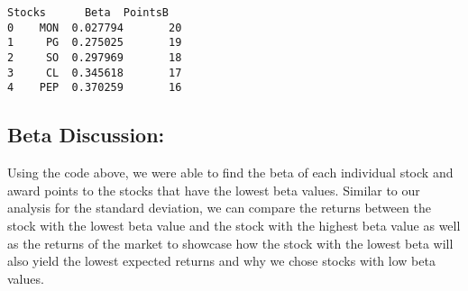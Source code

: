 \documentclass[11pt]{article}
\makeatletter
\newcommand{\boxspacing}{\kern\kvtcb@left@rule\kern\kvtcb@boxsep}
\newcommand{\prompt}[4]{
        {\ttfamily\llap{{\color{#2}[#3]:\hspace{3pt}#4}}\vspace{-\baselineskip}}
    }
\makeatother
\begin{document}
            \begin{tcolorbox}[breakable, size=fbox, boxrule=.5pt, pad at break*=1mm, opacityfill=0]
\prompt{Out}{outcolor}{23}{\boxspacing}
\begin{Verbatim}[commandchars=\\\{\}]
  Stocks      Beta  PointsB
0    MON  0.027794       20
1     PG  0.275025       19
2     SO  0.297969       18
3     CL  0.345618       17
4    PEP  0.370259       16
\end{Verbatim}
\end{tcolorbox}
        
    \hypertarget{beta-discussion}{%
\subsection{Beta Discussion:}\label{beta-discussion}}

Using the code above, we were able to find the beta of each individual
stock and award points to the stocks that have the lowest beta values.
Similar to our analysis for the standard deviation, we can compare the
returns between the stock with the lowest beta value and the stock with
the highest beta value as well as the returns of the market to showcase
how the stock with the lowest beta will also yield the lowest expected
returns and why we chose stocks with low beta values.
\end{document}
